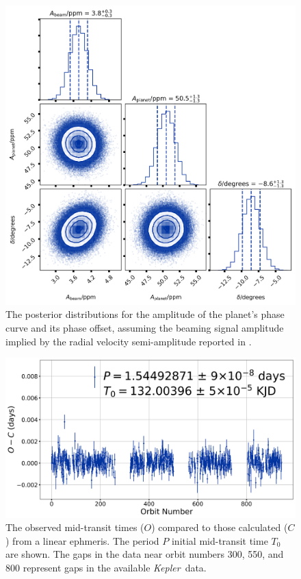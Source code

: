 \documentclass[manuscript]{aastex62}
\newcommand{\kepler}{{\it Kepler}}
\begin{document}
\begin{figure}
\includegraphics[width=\textwidth]{Aplanet-delta-fit-params_Analysis-of-Kepler76b.png}
\caption{The posterior distributions for the amplitude of the planet's phase curve and its phase offset, assuming the beaming signal amplitude implied by the radial velocity semi-amplitude reported in \citet{2013ApJ...771...26F}. }
\label{fig:Aplanet-delta-fit-params_Analysis-of-Kepler76b}
\end{figure}

\begin{figure}
    \includegraphics[width=\textwidth]{TTVs_Analysis_of_Kepler76b.png}
    \caption{The observed mid-transit times ($O$) compared to those calculated ($C$) from a linear ephmeris. The period $P$ initial mid-transit time $T_0$ are shown. The gaps in the data near orbit numbers 300, 550, and 800 represent gaps in the available \kepler\ data.}
    \label{fig:TTVs_Analysis_of_Kepler76b}
\end{figure}
\end{document}
